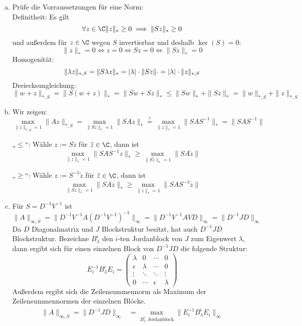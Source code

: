 \documentclass{mywork}
\begin{document}
	\begin{aufgabe}
		\begin{enumerate}[a)]
			\item
				Prüfe die Vorraussetzungen für eine Norm:\\
				Definitheit: Es gilt 
				\[
					\forall z\in\C \|z\|_* \ge 0 \implies \|Sz\|_*\ge 0
				\]
				und außerdem für $z\in\C$ wegen $S$ invertierbar und deshalb $\ker(S)=0$:
				\[
					\|z\|_* = 0 \iff z=0 \iff Sz=0 \iff \|Sz\|_* =0
				\]
				Homogenität:
				\[
					\|\lambda z\|_{*,S} = \|S\lambda z\|_* = |\lambda|\cdot \|Sz\|_` = |\lambda|\cdot \|z\|_{*,S}
				\]
				Dreiecksungleichung:
				\[
					\|w+z\|_{*,S} = \|S(w+z)\|_* = \|Sw+Sz\|_* \le \|Sw\|_* + \|Sz\|_* = \|w\|_{*,S} + \|z\|_{*,S}
				\]
			\item
				Wir zeigen:
				\[
					\max_{\|z\|_{*,S}=1}\|Az\|_{*,S} = \max_{\|Sz\|_*=1}\|SAz\|_* \stackrel != \max_{\|z\|_*=1}\|SAS^{-1}\|_* = \|SAS^{-1}\|
				\]
				\begin{seg}{„$\le$“:}
					Wähle $z:=S\tilde z$ für $\tilde z\in \C$, dann ist
					\[
						\max_{\|z\|_*=1}\|SAS^{-1}z\|_* \ge \max_{\|S\tilde z\|_*=1}\|SA\tilde z\|
					\]
				\end{seg}
				\begin{seg}{„$\ge$“:}
					Wähle $z:=S^{-1}\tilde z$ für $\tilde z\in \C$, dann ist
					\[
						\max_{\|Sz\|_*=1}\|SAz\|_* \ge \max_{\|\tilde z\|_*=1}\|SAS^{-1}\tilde z\|
					\]
				\end{seg}
				\newpage
			\item
				Für $S=D^{-1}V^{-1}$ ist
				\[
					\|A\|_{\infty,S} = \|D^{-1}V^{-1}A(D^{-1}V^{-1})^{-1}\|_\infty = \|D^{-1}V^{-1}AVD\|_\infty = \|D^{-1}JD\|_\infty
				\]
				Da $D$ Diagonalmatrix und $J$ Blockstruktur besitzt, hat auch $D^{-1}JD$ Blockstruktur.
				Bezeichne $B_\lambda^i$ den $i$-ten Jordanblock von $J$ zum Eigenwert $\lambda$, dann ergibt sich für einen einzelnen Block von $D^{-1}JD$ die folgende Struktur:
				\[
					E_i^{-1}B_\lambda^iE_i = \begin{pmatrix}\lambda & 0 & \cdots & 0\\\epsilon & \lambda &\cdots&0\\\vdots & \ddots &\ddots&\vdots\\0&\cdots & \epsilon&\lambda\end{pmatrix}
				\]
				Außerdem ergibt sich die Zeilensummennorm als Maximum der Zeilensummennormen der einzelnen Blöcke.
				\begin{align*}
					\|A\|_{\infty,S} = \|D^{-1}JD\|_\infty &= \max_{B_\lambda^i \text{ Jordanblock}} \|E^{-1}_iB_\lambda^iE_i\|_\infty \\

\end{align*}
\end{enumerate}
\end{aufgabe}
\end{document}
